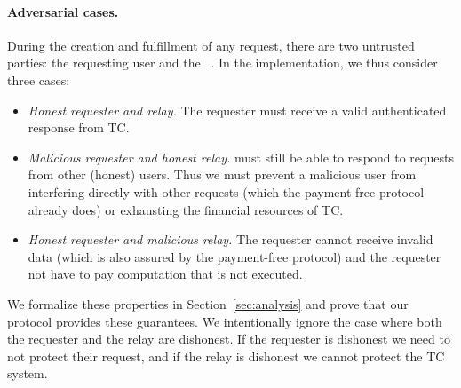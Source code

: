 \paragraph{Adversarial cases.}

During the creation and fulfillment of any request, there are two untrusted parties: the requesting user and the \tc~\medname. In the \tc implementation, we thus consider three cases:

\begin{itemize}
  \setlength{\itemsep}{2pt}
  \setlength{\parskip}{0pt}
  \setlength{\parsep}{0pt}
  \item {\it Honest requester and relay.}
    The requester must receive a valid authenticated response from TC.

  \item {\it Malicious requester and honest relay.}
    \tc must still be able to respond to requests from other (honest) users.
    Thus we must prevent a malicious user from interfering directly with other requests (which the payment-free protocol already does)
    or exhausting the financial resources of TC.

  \item {\it Honest requester and malicious relay.}
    The requester cannot receive invalid data (which is also assured by the payment-free protocol)
    and the requester not have to pay computation that is not executed.
\end{itemize}
We formalize these properties in Section~\ref{sec:analysis} and prove that our protocol provides these guarantees.
We intentionally ignore the case where both the requester and the relay are dishonest.
If the requester is dishonest we need to not protect their request, and if the relay is dishonest we cannot protect the TC system.




